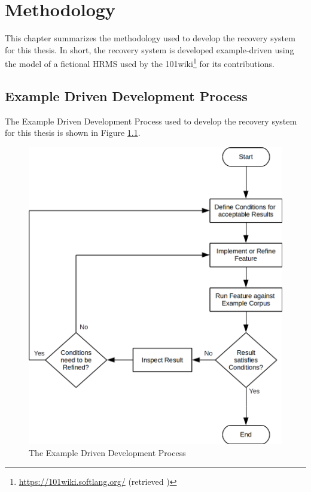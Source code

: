 \chapter{Methodology}
This chapter summarizes the methodology used to develop the recovery system for this thesis.
In short, the recovery system is developed example-driven using the model of a fictional \acrfull{HRMS} used by the 101wiki\footnote{\url{https://101wiki.softlang.org/} (retrieved )} for its contributions.

\section{Example Driven Development Process}
The Example Driven Development Process used to develop the recovery system for this thesis is shown in Figure \ref{figure:ExampleDrivenDevelopment}.
\begin{figure}[h!]
\begin{center}
\includegraphics[scale=.4]{images/ExampleDrivenDevelopment.png}
\end{center}
\caption{The Example Driven Development Process}
\label{figure:ExampleDrivenDevelopment}
\end{figure}
